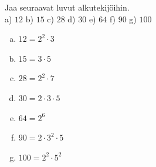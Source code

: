     
    \begin{tehtava}
    Jaa seuraavat luvut alkutekijöihin.\\
    a) $12$ \quad b) $15$ \quad c) $28$ \quad d) $30$ \quad e) $64$ \quad f) $90$ \quad g) $100$
    
    \begin{vastaus}
    \begin{enumerate}[a)]
    	\item $12 = 2^2 \cdot 3$
    	\item $15 = 3 \cdot 5$
    	\item $28 = 2^2 \cdot 7$
    	\item $30 = 2 \cdot 3 \cdot 5$
    	\item $64 = 2^6$
    	\item $90 = 2 \cdot 3^2 \cdot 5$
    	\item $100 = 2^2 \cdot 5^2$
    \end{enumerate}
    \end{vastaus}
    \end{tehtava}

